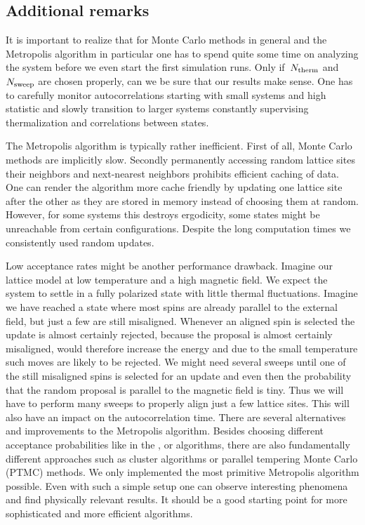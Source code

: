 \subsection{Additional remarks}

It is important to realize that for Monte Carlo methods in general and the
Metropolis algorithm in particular one has to spend quite some time on analyzing
the system before we even start the first simulation runs. Only if~$N_{\mathrm{therm}}$
and~$N_{\mathrm{sweep}}$ are chosen properly, can we be sure that our results make sense.
One has to carefully monitor autocorrelations starting with small systems and
high statistic and slowly transition to larger systems constantly supervising
thermalization and correlations between states.

The Metropolis algorithm is typically rather inefficient. First of all, Monte
Carlo methods are implicitly slow. Secondly permanently accessing random lattice
sites their neighbors and next-nearest neighbors prohibits efficient caching of
data. One can render the algorithm more cache friendly by updating one lattice
site after the other as they are stored in memory instead of choosing them at
random. However, for some systems this destroys ergodicity, \ie{} some states
might be unreachable from certain configurations. Despite the long computation
times we consistently used random updates.

Low acceptance rates might be another performance drawback. Imagine our lattice
model at low temperature and a high magnetic field. We expect the system to
settle in a fully polarized state with little thermal fluctuations. Imagine we
have reached a state where most spins are already parallel to the external
field, but just a few are still misaligned. Whenever an aligned spin is selected
the update is almost certainly rejected, because the proposal is almost
certainly misaligned, would therefore increase the energy and due to the small
temperature such moves are likely to be rejected. We might need several sweeps
until one of the still misaligned spins is selected for an update and even then
the probability that the random proposal is parallel to the magnetic field is
tiny. Thus we will have to perform many sweeps to properly align just a few
lattice sites. This will also have an impact on the autocorrelation time. There
are several alternatives and improvements to the Metropolis algorithm. Besides
choosing different acceptance probabilities like in the ,
 or  algorithms, there are also
fundamentally different approaches such as cluster algorithms or parallel
tempering Monte Carlo (PTMC) methods. We only implemented the most primitive
Metropolis algorithm possible. Even with such a simple setup one can observe
interesting phenomena and find physically relevant results. It should be a good
starting point for more sophisticated and more efficient algorithms.

